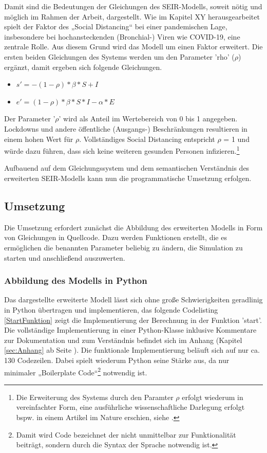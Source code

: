 \documentclass[12pt]{article}
\newcommand{\nocontentsline}[3]{}
\newcommand{\tocless}[2]{\bgroup\let\addcontentsline=\nocontentsline#1{#2}\egroup}
\begin{document}
Damit sind die Bedeutungen der Gleichungen des SEIR-Modells, soweit nötig und möglich im Rahmen der Arbeit, dargestellt. Wie im Kapitel XY herausgearbeitet spielt der Faktor des „Social Distancing“ bei einer pandemischen Lage, insbesondere bei hochansteckenden (Bronchial-) Viren wie COVID-19, eine zentrale Rolle. Aus diesem Grund wird das Modell um einen Faktor erweitert. Die ersten beiden Gleichungen des Systems werden um den Parameter 'rho' ($\rho$) ergänzt, damit ergeben sich folgende Gleichungen.

\begin{itemize}
    \item $s' = -(1-\rho)*\beta*S+I$
    \item $e' = (1-\rho)*\beta*S*I-\alpha*E$
\end{itemize}

Der Parameter '$\rho$' wird als Anteil im Wertebereich von 0 bis 1 angegeben. Lockdowns und andere öffentliche (Ausgangs-) Beschränkungen resultieren in einem hohen Wert für $\rho$. Vollständiges Social Distancing entspricht $\rho$ = 1 und würde dazu führen, dass sich keine weiteren gesunden Personen infizieren.\footnote{Die Erweiterung des Systems durch den Paramter $\rho$ erfolgt wiederum in vereinfachter Form, eine ausführliche wissenschaftliche Darlegung erfolgt bspw. in einem Artikel im Nature erschien, siehe \cite{EffectSocDist}.}

Aufbauend auf dem Gleichungssystem und dem semantischen Verständnis des erweiterten SEIR-Modells kann nun die programmatische Umsetzung erfolgen.

\subsection{Umsetzung}
Die Umsetzung erfordert zunächst die Abbildung des erweiterten Modells in Form von Gleichungen in Quellcode. Dazu werden Funktionen erstellt, die es ermöglichen die benannten Parameter beliebig zu ändern, die Simulation zu starten und anschließend auszuwerten.

\tocless \subsubsection{Abbildung des Modells in Python}
Das dargestellte erweiterte Modell lässt sich ohne große Schwierigkeiten geradlinig in Python übertragen und implementieren, das folgende Codelisting \ref{StartFunktion} zeigt die Implementierung der Berechnung in der Funktion 'start'. Die vollständige Implementierung in einer Python-Klasse inklusive Kommentare zur Dokumentation und zum Verständnis befindet sich im Anhang (Kapitel \ref{sec:Anhang} ab Seite \pageref{sec:Anhang}). Die funktionale Implementierung beläuft sich auf nur ca. 130 Codezeilen. Dabei spielt wiederum Python seine Stärke aus, da nur minimaler „Boilerplate Code“\footnote{Damit wird Code bezeichnet der nicht unmittelbar zur Funktionalität beiträgt, sondern durch die Syntax der Sprache notwendig ist.} notwendig ist.
\end{document}

